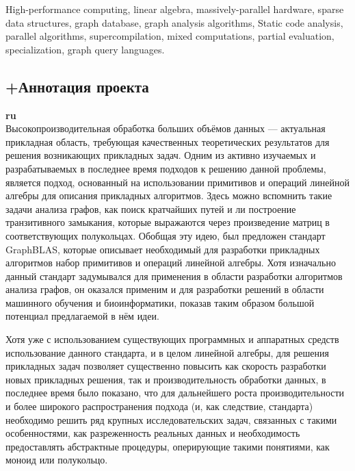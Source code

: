 \documentclass[12pt]{article}  %
\theoremstyle{remark}
\begin{document}
High-performance computing, linear algebra, massively-parallel hardware, sparse data structures, graph database, graph analysis algorithms, Static code analysis, parallel algorithms, supercompilation, mixed computations, partial evaluation, specialization, graph query languages.



\subsection{+Аннотация проекта}
\textbf{ru}\\

Высокопроизводительная обработка больших объёмов данных — актуальная прикладная область, требующая качественных теоретических результатов для решения возникающих прикладных задач. Одним из активно изучаемых и разрабатываемых в последнее время подходов к решению данной проблемы, является подход, основанный на использовании примитивов и операций линейной алгебры для описания прикладных алгоритмов. Здесь можно вспомнить такие задачи анализа графов, как поиск кратчайших путей и ли построение транзитивного замыкания, которые выражаются через произведение матриц в соответствующих полукольцах. Обобщая эту идею, был предложен стандарт GraphBLAS, которые описывает необходимый для разработки прикладных алгоритмов набор примитивов и операций линейной алгебры. Хотя изначально данный стандарт задумывался для применения в области разработки алгоритмов анализа графов, он оказался применим и для разработки решений в области машинного обучения и биоинформатики, показав таким образом большой потенциал предлагаемой в нём идеи.

Хотя уже с использованием существующих программных и аппаратных средств использование данного стандарта, и в целом линейной алгебры, для решения прикладных задач позволяет существенно повысить как скорость разработки новых прикладных решения, так и производительность обработки данных, в последнее время было показано, что для дальнейшего роста производительности и более широкого распространения подхода (и, как следствие, стандарта) необходимо решить ряд крупных исследовательских задач, связанных с такими особенностями, как разреженность реальных данных и необходимость предоставлять абстрактные процедуры, оперирующие такими понятиями, как моноид или полукольцо.
\end{document}
